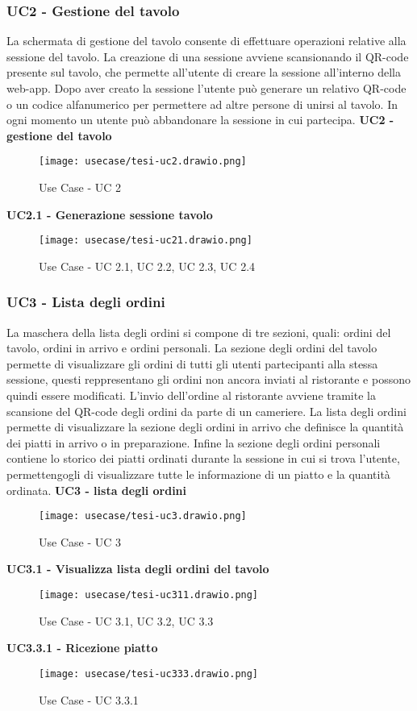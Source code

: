 \subsubsection{UC2 - Gestione del tavolo}
La schermata di gestione del tavolo consente di effettuare operazioni relative alla sessione del tavolo. La creazione di una sessione avviene scansionando il QR-code presente sul tavolo, che permette all'utente di creare la sessione all'interno della web-app. Dopo aver creato la sessione l'utente può generare un relativo QR-code o un codice alfanumerico per permettere ad altre persone di unirsi al tavolo. In ogni momento un utente può abbandonare la sessione in cui partecipa.
\textbf{UC2 - gestione del tavolo}
\begin{figure}[H]
    \centering
    \texttt{[image: usecase/tesi-uc2.drawio.png]}
    \caption{Use Case - UC 2}
\end{figure}
\textbf{UC2.1 - Generazione sessione tavolo}
\begin{figure}[H]
    \centering
    \texttt{[image: usecase/tesi-uc21.drawio.png]}
    \caption{Use Case - UC 2.1, UC 2.2, UC 2.3, UC 2.4}
\end{figure}
\subsubsection{UC3 - Lista degli ordini}
La maschera della lista degli ordini si compone di tre sezioni, quali: ordini del tavolo, ordini in arrivo e ordini personali.
La sezione degli ordini del tavolo permette di visualizzare gli ordini di tutti gli utenti partecipanti alla stessa sessione, questi reppresentano gli ordini non ancora inviati al ristorante e possono quindi essere modificati. L'invio dell'ordine al ristorante avviene tramite la scansione del QR-code degli ordini da parte di un cameriere. 
La lista degli ordini permette di visualizzare la sezione degli ordini in arrivo che definisce la quantità dei piatti in arrivo o in preparazione.
Infine la sezione degli ordini personali contiene lo storico dei piatti ordinati durante la sessione in cui si trova l'utente, permettengogli di visualizzare tutte le informazione di un piatto e la quantità ordinata.
\textbf{UC3 - lista degli ordini}
\begin{figure}[H]
    \centering
    \texttt{[image: usecase/tesi-uc3.drawio.png]}
    \caption{Use Case - UC 3}
\end{figure}
\textbf{UC3.1 - Visualizza lista degli ordini del tavolo}
\begin{figure}[H]
    \centering
    \texttt{[image: usecase/tesi-uc311.drawio.png]}
    \caption{Use Case - UC 3.1, UC 3.2, UC 3.3}
\end{figure}
\textbf{UC3.3.1 - Ricezione piatto}
\begin{figure}[H]
    \centering
    \texttt{[image: usecase/tesi-uc333.drawio.png]}
    \caption{Use Case - UC 3.3.1}
\end{figure}
